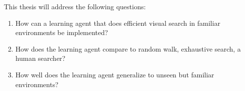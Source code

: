 % 
% 
% 
% 
% 
% 
% 
% 

This thesis will address the following questions:

\begin{enumerate}
  \item \label{itm:rq1} How can a learning agent that does efficient visual search in familiar environments be implemented?
  \item \label{itm:rq2} How does the learning agent compare to random walk, exhaustive search, a human searcher?
  \item \label{itm:rq3} How well does the learning agent generalize to unseen but familiar environments?
\end{enumerate}


